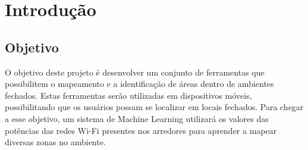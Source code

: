 \chapter{Introdução}\label{chp:introduction}

\section{Objetivo}\label{sec:objetctive}
O objetivo deste projeto é desenvolver um conjunto de ferramentas que possibilitem
o mapeamento e a identificação de áreas dentro de ambientes fechados. Estas
ferramentas serão utilizadas em dispositivos móveis, possibilitando que os
usuários possam se localizar em locais fechados. Para chegar a esse objetivo, um
sistema de Machine Learning utilizará os valores das potências das redes Wi-Fi
presentes nos arredores para aprender a mapear diversas zonas no ambiente.

